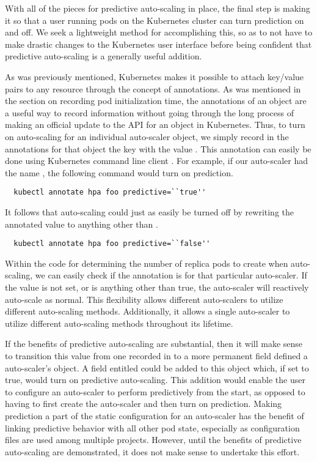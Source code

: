 With all of the pieces for predictive auto-scaling in place, the final step is
making it so that a user running pods on the Kubernetes cluster can turn
prediction on and off. We seek a lightweight method for accomplishing this, so
as to not have to make drastic changes to the Kubernetes user interface before
being confident that predictive auto-scaling is a generally useful addition.

As was previously mentioned, Kubernetes makes it
possible to attach key/value pairs to any
resource through the concept of annotations. As was mentioned in the section on
recording pod initialization time, the annotations of an object are a useful way
to record information without going through the long process of making an
official update to the API for an object in Kubernetes. Thus, to turn on
auto-scaling for an individual auto-scaler object, we simply record in the annotations for
that object the key  with the value . This
annotation can easily be done using Kubernetes command line
client \cite{k8s-kubectl-annotate}. For example,
if our auto-scaler had the name , the following command would turn
on prediction.

\begin{verbatim}
  kubectl annotate hpa foo predictive=``true''
\end{verbatim}

It follows that auto-scaling could just as easily be turned off by rewriting the
annotated value to anything other than .

\begin{verbatim}
  kubectl annotate hpa foo predictive=``false''
\end{verbatim}

Within the code for determining the number of replica pods to create when
auto-scaling, we can easily check if the  annotation is
 for that particular auto-scaler. If the value is not set, or
is anything other than true, the auto-scaler will reactively auto-scale as normal.
This flexibility allows different auto-scalers to utilize different auto-scaling
methods. Additionally, it allows a single auto-scaler to utilize different
auto-scaling methods throughout its lifetime.

If the benefits of predictive auto-scaling are substantial, then it will make
sense to transition this value from one recorded in  to a
more permanent field defined a auto-scaler's
 object. A field entitled
 could be added to this object which, if set to true, would
turn on predictive auto-scaling. This addition would enable the user to
configure an
auto-scaler to perform predictively from the start, as opposed to having to first
create the auto-scaler and then turn on prediction. Making prediction a part of
the static configuration for an auto-scaler has the benefit of linking predictive
behavior with all other pod state, especially as configuration files are used
among multiple projects. However, until the benefits of predictive
auto-scaling are demonstrated, it does not make sense to undertake this effort.
